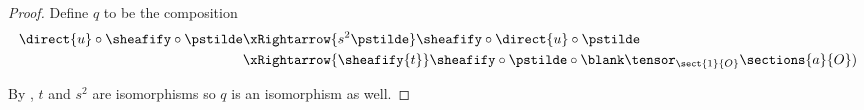 
\begin{proof}
Define $q$ to be the composition
\begin{align*}
	\direct{u} \circ \sheafify \circ \pstilde 
	& \xRightarrow{s^2\pstilde} \sheafify \circ \direct{u} \circ \pstilde\\
	& \xRightarrow{\sheafify{t}} \sheafify \circ \pstilde \circ \blank \tensor_{\sect{1}{O}} \sections{a}{O})
\end{align*}

By , $t$ and $s^2$ are isomorphisms so $q$ is an isomorphism as well.
\end{proof}